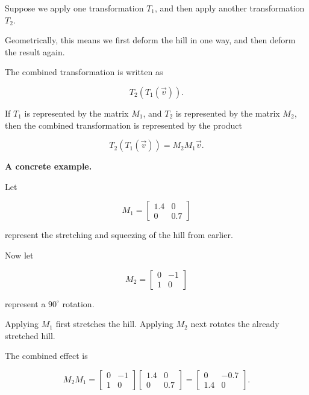\documentclass[11pt,openany]{book}
\theoremstyle{definition}
\begin{document}
Suppose we apply one transformation $T_1$, and then apply another transformation $T_2$.

\medskip

Geometrically, this means we first deform the hill in one way, and then deform the result again.

\medskip

The combined transformation is written as

\[
T_2(T_1(\vec{v})).
\]

\medskip

If $T_1$ is represented by the matrix $M_1$, and $T_2$ is represented by the matrix $M_2$, 
then the combined transformation is represented by the product

\[
T_2(T_1(\vec{v})) = M_2 M_1 \vec{v}.
\]

\medskip

\textbf{A concrete example.}

Let

\[
M_1 =
\begin{bmatrix}
1.4 & 0 \\
0 & 0.7
\end{bmatrix}
\]

represent the stretching and squeezing of the hill from earlier.

\medskip

Now let

\[
M_2 =
\begin{bmatrix}
0 & -1 \\
1 & 0
\end{bmatrix}
\]

represent a $90^\circ$ rotation.

\medskip

Applying $M_1$ first stretches the hill. Applying $M_2$ next rotates the already stretched hill.

\medskip

The combined effect is

\[
M_2 M_1 =
\begin{bmatrix}
0 & -1 \\
1 & 0
\end{bmatrix}
\begin{bmatrix}
1.4 & 0 \\
0 & 0.7
\end{bmatrix}
=
\begin{bmatrix}
0 & -0.7 \\
1.4 & 0
\end{bmatrix}.
\]

\medskip
\end{document}
